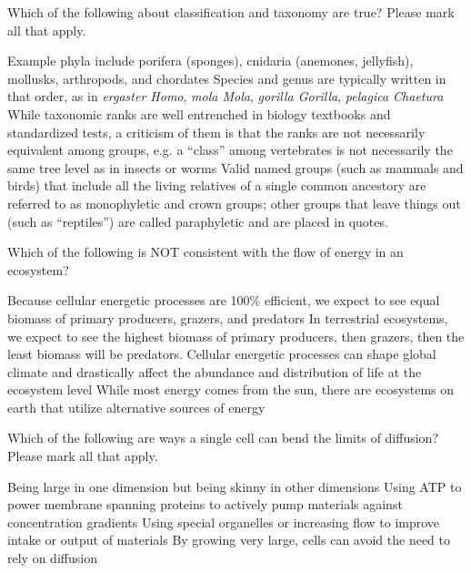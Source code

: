 \documentclass[exam,addpoints,noanswers]{exam}
\begin{document}
\begin{questions}
\question[1] Which of the following about classification and taxonomy are true? Please mark all that apply.
\begin{choices}
\CorrectChoice Example phyla include porifera (sponges), cnidaria (anemones, jellyfish), mollusks, arthropods, and chordates 
\choice Species and genus are typically written in that order, as in \emph{ergaster Homo}, \emph{mola Mola}, \emph{gorilla Gorilla}, \emph{pelagica Chaetura}
\CorrectChoice While taxonomic ranks are well entrenched in biology textbooks and standardized tests, a criticism of them is that the ranks are not necessarily equivalent among groups, e.g. a ``class'' among vertebrates is not necessarily the same tree level as in insects or worms
\CorrectChoice Valid named groups (such as mammals and birds) that include all the living relatives of a single common ancestory are referred to as monophyletic and crown groups; other groups that leave things out (such as ``reptiles'') are called paraphyletic and are placed in quotes. 
\end{choices}



\clearpage
\question[1] Which of the following is NOT consistent with the flow of energy in an ecosystem?
\begin{choices}
\CorrectChoice Because cellular energetic processes are 100\% efficient, we expect to see equal biomass of primary producers, grazers, and predators
\choice In terrestrial ecosystems, we expect to see the highest biomass of primary producers, then grazers, then the least biomass will be predators. 
\choice Cellular energetic processes can shape global climate and drastically affect the abundance and distribution of life at the ecosystem level
\choice While most energy comes from the sun, there are ecosystems on earth that utilize alternative sources of energy
\end{choices}





\question[1] Which of the following are ways a single cell can bend the limits of diffusion? Please mark all that apply. 
\begin{choices}
\CorrectChoice Being large in one dimension but being skinny in other dimensions
\CorrectChoice Using ATP to power membrane spanning proteins to actively pump materials against concentration gradients
\CorrectChoice Using special organelles or increasing flow to improve intake or output of materials
\choice By growing very large, cells can avoid the need to rely on diffusion
\end{choices}





\end{questions}
\end{document}
